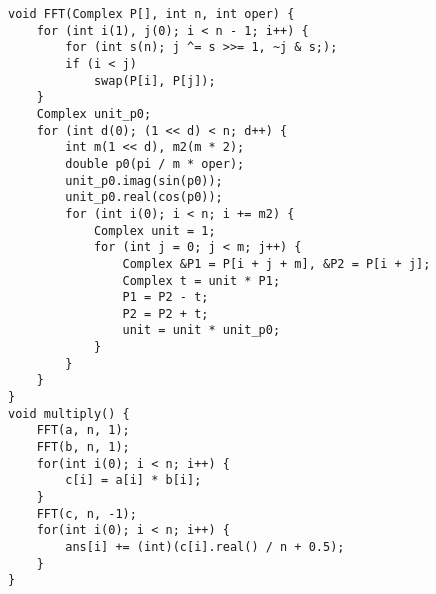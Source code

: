 \begin{lstlisting}
void FFT(Complex P[], int n, int oper) {
	for (int i(1), j(0); i < n - 1; i++) {
		for (int s(n); j ^= s >>= 1, ~j & s;);
		if (i < j)
			swap(P[i], P[j]);
	}
	Complex unit_p0;
	for (int d(0); (1 << d) < n; d++) {
		int m(1 << d), m2(m * 2);
		double p0(pi / m * oper);
		unit_p0.imag(sin(p0));
		unit_p0.real(cos(p0));
		for (int i(0); i < n; i += m2) {
			Complex unit = 1;
			for (int j = 0; j < m; j++) {
				Complex &P1 = P[i + j + m], &P2 = P[i + j];
				Complex t = unit * P1;
				P1 = P2 - t;
				P2 = P2 + t;
				unit = unit * unit_p0;
			}
		}
	}
}
void multiply() {
	FFT(a, n, 1);
	FFT(b, n, 1);
	for(int i(0); i < n; i++) {
		c[i] = a[i] * b[i];
	}
	FFT(c, n, -1);
	for(int i(0); i < n; i++) {
		ans[i] += (int)(c[i].real() / n + 0.5);
	}
}
\end{lstlisting}
